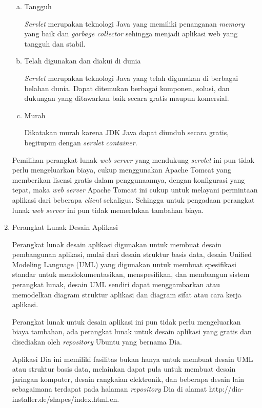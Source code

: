 \documentclass[pdftex,12pt, oneside]{article}
\begin{document}
\begin{enumerate}[1.]
\begin{enumerate}[a.]
      \item Tangguh
      
      \textit{Servlet} merupakan teknologi Java yang memiliki penanganan \textit{memory} yang baik dan \textit{garbage collector} sehingga menjadi aplikasi web yang tangguh dan stabil.
      
      \item Telah digunakan dan diakui di dunia
      
      \textit{Servlet} merupakan teknologi Java yang telah digunakan di berbagai belahan dunia. Dapat ditemukan berbagai komponen, solusi, dan dukungan yang ditawarkan baik secara gratis maupun komersial.
      
      \item Murah
      
      Dikatakan murah karena JDK Java dapat diunduh secara gratis, begitupun dengan \textit{servlet container}.
    \end{enumerate}

Pemilihan perangkat lunak \textit{web server} yang mendukung \textit{servlet} ini pun tidak perlu mengeluarkan biaya, cukup menggunakan Apache Tomcat yang memberikan lisensi gratis dalam penggunaannya, dengan konfigurasi yang tepat, maka \textit{web server} Apache Tomcat ini cukup untuk melayani permintaan aplikasi dari beberapa \textit{client} sekaligus. Sehingga untuk pengadaan perangkat lunak \textit{web server} ini pun tidak memerlukan tambahan biaya.
  
  \item Perangkat Lunak Desain Aplikasi
  
Perangkat lunak desain aplikasi digunakan untuk membuat desain pembangunan aplikasi, mulai dari desain struktur basis data, desain Unified Modeling Language (UML) yang digunakan untuk membuat spesifikasi standar untuk mendokumentasikan, menspesifikan, dan membangun sistem perangkat lunak, desain UML sendiri dapat menggambarkan atau memodelkan diagram struktur aplikasi dan diagram sifat atau cara kerja aplikasi.

Perangkat lunak untuk desain aplikasi ini pun tidak perlu mengeluarkan biaya tambahan, ada perangkat lunak untuk desain aplikasi yang gratis dan disediakan oleh \textit{repository}  Ubuntu yang bernama Dia.

Aplikasi Dia ini memiliki fasilitas bukan hanya untuk membuat desain UML atau struktur basis data, melainkan dapat pula untuk membuat desain jaringan komputer, desain rangkaian elektronik, dan beberapa desain lain sebagaimana terdapat pada halaman \textit{repository} Dia di alamat http://dia-installer.de/shapes/index.html.en.
  

\end{enumerate}
\end{document}
